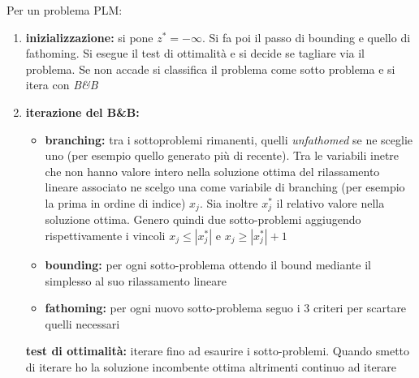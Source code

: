 \documentclass[a4paper,12pt, oneside]{book}
\begin{document}
Per un problema PLM:
\begin{shaded}
  \begin{enumerate}
    \item \textbf{inizializzazione:} si pone $z^*=-\infty$. Si fa poi
    il passo di bounding e quello di fathoming. Si esegue il test di
    ottimalità e si decide se tagliare via il problema. Se non accade
    si classifica il problema come sotto problema e si itera con
    \textit{B\&B}
    \item \textbf{iterazione del B\&B:}
    \begin{itemize}
      \item \textbf{branching:} tra i sottoproblemi rimanenti, quelli
      \textit{unfathomed} se ne sceglie uno (per esempio quello
      generato più di recente). Tra le variabili inetre che non hanno
      valore intero nella soluzione ottima del rilassamento lineare
      associato ne scelgo una come variabile di branching (per esempio
      la prima in ordine di indice) $x_j$. Sia inoltre $x_j^*$ il
      relativo valore nella soluzione ottima. Genero quindi due
      sotto-problemi aggiugendo rispettivamente i vincoli $x_j\leq
      |x_j^*|$ e $x_j\geq|x_j^*|+1$
      \item \textbf{bounding:} per ogni sotto-problema ottendo il
      bound mediante il simplesso al suo rilassamento lineare
      \item \textbf{fathoming:} per ogni nuovo sotto-problema seguo i
      3 criteri per scartare quelli necessari
    \end{itemize}
    \textbf{test di ottimalità:} iterare fino ad esaurire i
    sotto-problemi. Quando smetto di iterare ho la soluzione
    incombente ottima altrimenti continuo ad iterare 
  \end{enumerate}
\end{shaded}
\end{document}

